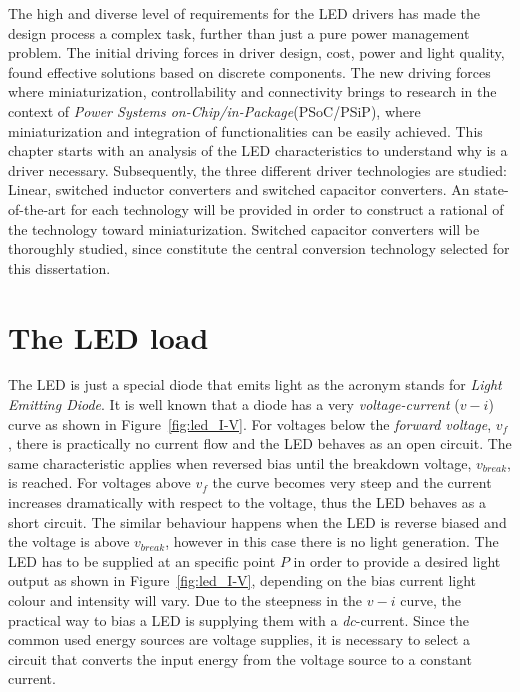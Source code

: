 The high and diverse level of requirements for the LED drivers has made the design process a complex task, further than just a pure power management problem. The initial driving forces in driver design, cost, power and light quality, found effective solutions  based on discrete components.  The new driving forces where miniaturization, controllability and connectivity brings to research in the context of \emph{Power Systems on-Chip/in-Package}(PSoC/PSiP), where miniaturization and integration of functionalities can be easily achieved. This chapter starts with an analysis of the LED characteristics to understand why is a driver necessary. Subsequently, the three different driver technologies are studied: Linear, switched inductor converters and switched capacitor converters. An state-of-the-art for each technology will be provided in order to construct a rational of the technology toward miniaturization. Switched capacitor converters will be thoroughly studied, since constitute the central conversion technology selected for this dissertation.


\section{The LED load}
\label{sc:LED_load}
The LED is just a special diode that emits light as the acronym stands for \emph{Light Emitting Diode}. It is well known that a diode has a very \emph{voltage-current} ($v-i$) curve as shown in Figure~\ref{fig:led_I-V}. For voltages below the \emph{forward voltage}, $v_{f}$, there is practically no current flow and the LED behaves as an open circuit. The same characteristic applies  when reversed bias until the breakdown voltage, $v_{break}$, is reached. For voltages above $v_{f}$ the curve becomes very steep and the current increases dramatically with respect to the voltage, thus the LED behaves as a short circuit. The similar behaviour happens when the LED is reverse biased and the voltage is above $v_{break}$, however in this case there is no light generation. The LED has to be supplied at an specific point $P$ in order to provide a desired light output as shown in Figure~\ref{fig:led_I-V}, depending on the bias current light colour and intensity will vary. Due to the steepness in the $v-i$ curve, the practical way to bias a LED is supplying them with a \emph{dc}-current. Since the common used energy sources are voltage supplies, it is necessary to select a circuit that converts the input energy from the voltage source to a constant current.

